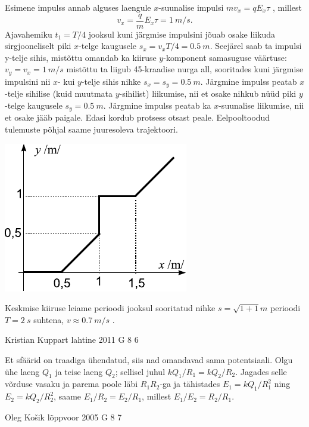 \documentclass[11pt]{article}
\begin{document}
{{\ifSolution
Esimene impulss annab alguses laengule $x$-suunalise impulsi $mv_x = qE_x\tau$ , millest
\[
v_{x}=\frac{q}{m} E_{x} \tau= \SI{1}{m/s}.
\]
Ajavahemiku $t_1 = T /4$ jooksul kuni järgmise impulsini jõuab osake liikuda sirgjooneliselt piki $x$-telge kaugusele
$s_x = v_xT /4 = \SI{0,5}{m}$. Seejärel saab ta impulsi y-telje sihis, mistõttu omandab ka kiiruse $y$-komponent
samasuguse väärtuse: $v_y = v_x = \SI{1}{m/s}$ mistõttu ta liigub \num{45}-kraadise nurga all,
sooritades kuni järgmise impulsini nii $x$- kui $y$-telje sihis nihke $s_x = s_y = \SI{0,5}{m}$. Järgmine impulss peatab $x$-telje sihilise (kuid muutmata $y$-sihilist) liikumise, nii et
osake nihkub nüüd piki $y$-telge kaugusele $s_y = \SI{0,5}{m}$. Järgmine impulss peatab ka $x$-suunalise liikumise, nii et osake jääb paigale. Edasi kordub protsess otsast
peale. Eelpooltoodud tulemuste põhjal saame juuresoleva trajektoori.

\begin{center}
	\includegraphics[width=0.6\linewidth]{2009-v2g-06-lah}
\end{center}

Keskmise kiiruse leiame perioodi jooksul sooritatud nihke $s = \sqrt{1+1}\si{m}$ perioodi $T = \SI{2}{s}$ suhtena, $v \approx \SI{0,7}{m/s}$ .
\fi
}

{Kristian Kuppart} %
{lahtine} %
{2011} %
{G 8} %
{6} %
{

\ifSolution
Et sfäärid on traadiga ühendatud, siis nad omandavad sama potentsiaali. Olgu ühe laeng $Q_1$ ja teise laeng $Q_2$;
sellisel juhul $kQ_1/R_1=kQ_2/R_2$. Jagades selle võrduse vasaku ja parema poole läbi $R_1R_2$-ga ja tähistades $E_1=kQ_1/R_1^2$ ning
$E_2=kQ_2/R_2^2$, saame $E_1/R_2 = E_2/R_1$, millest $E_1/E_2=R_2/R_1$.
\fi
}

{Oleg Košik} %
{lõppvoor} %
{2005} %
{G 8} %
{7} %
{

}}
\end{document}
